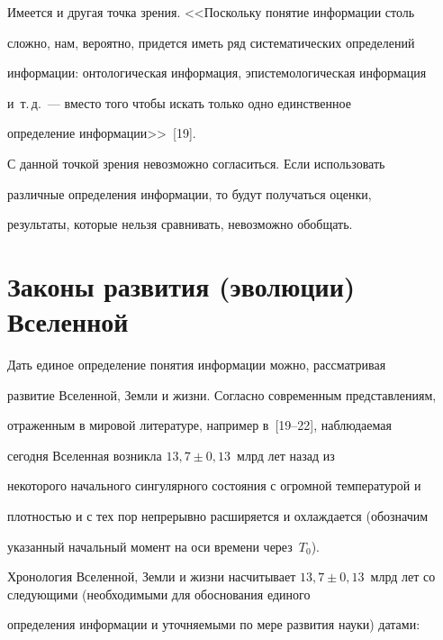    


   Имеется и другая точка зрения. <<Поскольку понятие информации столь 


сложно, нам, вероятно, придется иметь ряд систематических определений 


информации: онтологическая информация, эпистемологическая информация 


и~т.\,д.~--- вместо того чтобы искать только одно единственное 


определение информации>>~[19].


   


   С данной точкой зрения невозможно согласиться. Если использовать 


различные определения информации, то будут получаться оценки, 


результаты, которые нельзя сравнивать, невозможно обобщать.


   


\section{Законы развития (эволюции) Вселенной}





   Дать единое определение понятия информации можно, рассматривая 


развитие Вселенной, Земли и жизни. Согласно современным представлениям, 


отраженным в мировой литературе, например в~[19--22], наблюдаемая 


сегодня Вселенная возникла $13{,}7 \pm 0{,}13$~млрд лет назад из 


некоторого начального сингулярного состояния с огромной температурой и 


плотностью и с тех пор непрерывно расширяется и охлаждается (обозначим 


указанный начальный момент на оси времени через~$T_0$).


   


   Хронология Вселенной, Земли и жизни насчитывает $13{,}7 \pm 


0{,}13$~млрд лет со следующими (необходимыми для обоснования единого 


определения информации и уточняемыми по мере развития науки) датами:





